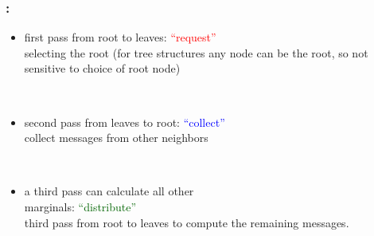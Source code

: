 \begin{frame} \frametitle{\secname: \subsecname}
	\begin{minipage}[c]{12.1cm}
		\begin{minipage}[][1cm][c]{8cm}
			\begin{itemize}
				\item first pass from root to leaves: \textcolor{red}{``request''}\\
				selecting the root (for tree structures any node can be the root, so not sensitive to choice of root node)
			\end{itemize}
		\end{minipage}
		\hfill {} \\
		\begin{minipage}[c]{8cm}
			\begin{itemize}
				\item second pass from leaves to root: \textcolor{blue}{``collect''}\\
				collect messages from other neighbors
			\end{itemize}
		\end{minipage}
		\hfill {} \\
		\pause
		\begin{minipage}{8cm}
			\begin{itemize}
				\item a third pass can calculate all other \\
					marginals: \textcolor{darkgreen}{``distribute''}\\
					third pass from root to leaves to compute the remaining messages.
			\end{itemize}
		\end{minipage}
		\hfill {} \\
	\end{minipage}
\end{frame}

